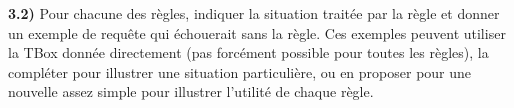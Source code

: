 \documentclass[a4paper,12pt]{report}
\begin{document}

\newpage

{}

\textbf{3.2)} Pour chacune des règles, indiquer la situation traitée par la règle et donner un exemple de requête qui échouerait sans la règle. Ces exemples peuvent
    utiliser la TBox donnée directement (pas forcément possible pour toutes les règles), la compléter pour illustrer une situation particulière, ou en proposer pour
    une nouvelle assez simple pour illustrer l'utilité de chaque règle.
\end{document}
